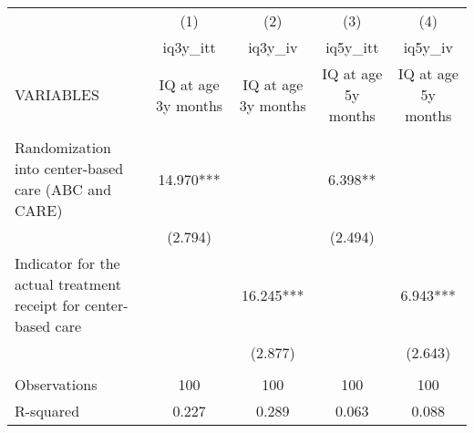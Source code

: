\documentclass[]{article}
\begin{document}
\begin{tabular}{lcccc} \hline
 & (1) & (2) & (3) & (4) \\
 & iq3y\_itt & iq3y\_iv & iq5y\_itt & iq5y\_iv \\
VARIABLES & IQ at age 3y months & IQ at age 3y months & IQ at age 5y months & IQ at age 5y months \\ \hline
 &  &  &  &  \\
Randomization into center-based care (ABC and CARE) & 14.970*** &  & 6.398** &  \\
 & (2.794) &  & (2.494) &  \\
Indicator for the actual treatment receipt for center-based care &  & 16.245*** &  & 6.943*** \\
 &  & (2.877) &  & (2.643) \\
 &  &  &  &  \\
Observations & 100 & 100 & 100 & 100 \\
 R-squared & 0.227 & 0.289 & 0.063 & 0.088 \\ \hline
\end{tabular}
\end{document}
